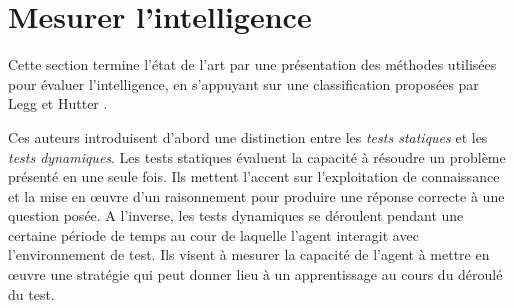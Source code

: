 






\section{Mesurer l'intelligence}

\noindent
Cette section termine l'état de l'art par une présentation des méthodes utilisées pour évaluer l'intelligence,  
en s'appuyant sur une classification proposées par Legg et Hutter \cite{legg_universal_2007}.

Ces auteurs introduisent d'abord une distinction entre les \emph{tests statiques} et les \emph{tests dynamiques}. 
Les tests statiques évaluent la capacité à résoudre un problème présenté en une seule fois. 
Ils mettent l'accent sur l'exploitation de connaissance et la mise en \oe uvre d'un raisonnement pour produire une réponse correcte à une question posée. 
A l'inverse, les tests dynamiques se déroulent pendant une certaine période de temps au cour de laquelle l'agent interagit avec l'environnement de test. 
Ils visent à mesurer la capacité de l'agent à mettre en \oe uvre une stratégie qui peut donner lieu à un apprentissage au cours du déroulé du test. 

